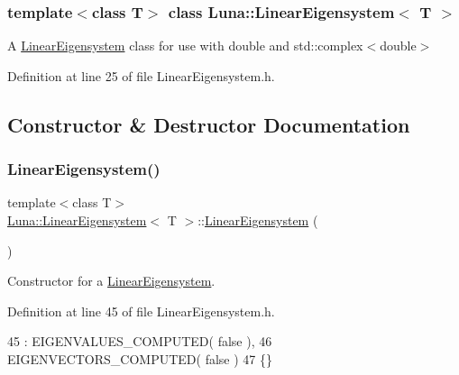 \subsubsection*{template$<$class T$>$\newline
class Luna\+::\+Linear\+Eigensystem$<$ T $>$}

A \hyperlink{classLuna_1_1LinearEigensystem}{Linear\+Eigensystem} class for use with double and std\+::complex$<$double$>$ 

Definition at line 25 of file Linear\+Eigensystem.\+h.



\subsection{Constructor \& Destructor Documentation}
\mbox{\label{classLuna_1_1LinearEigensystem_a6a285716463cb439b2c82d0055d247c5}} 
\subsubsection{\texorpdfstring{Linear\+Eigensystem()}{LinearEigensystem()}}
{\footnotesize\ttfamily template$<$class T$>$ \\
\hyperlink{classLuna_1_1LinearEigensystem}{Luna\+::\+Linear\+Eigensystem}$<$ T $>$\+::\hyperlink{classLuna_1_1LinearEigensystem}{Linear\+Eigensystem} (\begin{DoxyParamCaption}{ }\end{DoxyParamCaption})\hspace{0.3cm}{\ttfamily [inline]}}



Constructor for a \hyperlink{classLuna_1_1LinearEigensystem}{Linear\+Eigensystem}. 



Definition at line 45 of file Linear\+Eigensystem.\+h.


\begin{DoxyCode}
45                         : EIGENVALUES\_COMPUTED( \textcolor{keyword}{false} ),
46                           EIGENVECTORS\_COMPUTED( \textcolor{keyword}{false} )
47     \{\}
\end{DoxyCode}
\mbox{\label{classLuna_1_1LinearEigensystem_a3bb8fffcca088facf2e8efedc20d9944}} 
